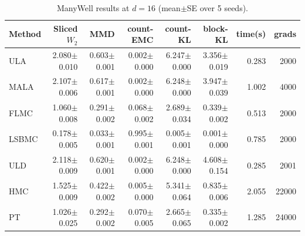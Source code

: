 \begin{table}[t]
\centering
\small
\caption{ManyWell results at $d=16$ (mean$\pm$SE over 5 seeds).}
\label{tab:manywell_d16}
\begin{tabular}{lrrrrrrr}
\toprule
Method & Sliced $W_2$ & MMD & count-EMC & count-KL & block-KL & time(s) & grads \\
\midrule
ULA & 2.080$\pm$0.010 & 0.603$\pm$0.001 & 0.002$\pm$0.000 & 6.247$\pm$0.000 & 3.356$\pm$0.019 & 0.283 & 2000 \\
MALA & 2.107$\pm$0.006 & 0.617$\pm$0.001 & 0.002$\pm$0.000 & 6.248$\pm$0.000 & 3.947$\pm$0.039 & 1.002 & 4000 \\
FLMC & 1.060$\pm$0.008 & 0.291$\pm$0.002 & 0.068$\pm$0.002 & 2.689$\pm$0.034 & 0.339$\pm$0.002 & 0.513 & 2000 \\
LSBMC & 0.178$\pm$0.005 & 0.033$\pm$0.001 & 0.995$\pm$0.001 & 0.005$\pm$0.001 & 0.001$\pm$0.000 & 0.785 & 2000 \\
ULD & 2.118$\pm$0.009 & 0.620$\pm$0.001 & 0.002$\pm$0.000 & 6.248$\pm$0.000 & 4.608$\pm$0.154 & 0.285 & 2001 \\
HMC & 1.525$\pm$0.009 & 0.422$\pm$0.002 & 0.005$\pm$0.000 & 5.341$\pm$0.064 & 0.835$\pm$0.006 & 2.055 & 22000 \\
PT & 1.026$\pm$0.025 & 0.292$\pm$0.002 & 0.070$\pm$0.005 & 2.665$\pm$0.065 & 0.335$\pm$0.002 & 1.285 & 24000 \\
\bottomrule
\end{tabular}
\end{table}